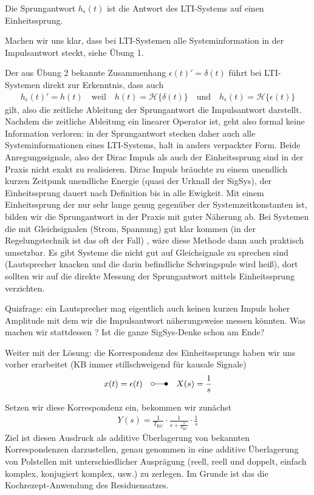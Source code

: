 \documentclass[11pt,a4paper,DIV=12]{scrartcl}
\numberwithin{equation}{section}
\numberwithin{figure}{section}
\begin{document}
\begin{Loesung}
\begin{itemize}
Die Sprungantwort $h_\epsilon(t)$ ist die Antwort des LTI-Systems auf einen Einheitssprung.

Machen wir uns klar, dass bei LTI-Systemen alle Systeminformation in der Impulsantwort
steckt, siehe Übung 1.

Der aus Übung 2 bekannte Zusammenhang $\epsilon(t)' = \delta(t)$ führt bei LTI-Systemen
direkt zur Erkenntnis, dass auch
\begin{eqnarray}
h_\epsilon(t)' = h(t)\quad\text{weil}\quad
h(t)=\mathcal{H}\{\delta(t)\}
\quad\text{und}\quad
h_\epsilon(t)=\mathcal{H}\{\epsilon(t)\}
\end{eqnarray}
gilt, also die zeitliche Ableitung der Sprungantwort die Impulsantwort darstellt.
%
Nachdem die zeitliche Ableitung ein linearer Operator ist, geht also formal keine
Information verloren: in der Sprungantwort stecken daher auch alle Systeminformationen
eines LTI-Systems, halt in anders verpackter Form.
%
Beide Anregungssignale, also der Dirac Impuls als auch der Einheitssprung sind in
der Praxis nicht exakt zu realisieren. Dirac Impuls bräuchte zu einem unendlich kurzen
Zeitpunk unendliche Energie (quasi der Urknall der SigSys), der Einheitssprung
dauert nach Definition bis in alle Ewigkeit.
%
Mit einem Einheitssprung der nur sehr lange genug gegenüber der Systemzeitkonstanten
ist, bilden wir die Sprungantwort in der Praxis mit guter Näherung ab.
%
Bei Systemen die mit Gleichsignalen
(Strom, Spannung) gut klar kommen
(in der Regelungstechnik ist das oft der Fall)
, wäre diese Methode dann auch praktisch umsetzbar.
%
Es gibt Systeme die nicht gut auf Gleichsignale zu sprechen sind (Lautsprecher
knacken und die darin befindliche Schwingspule wird heiß),
dort sollten wir auf die direkte Messung der Sprungantwort mittels
Einheitssprung verzichten.
%

Quizfrage: ein Lautsprecher mag eigentlich auch keinen kurzen Impuls hoher Amplitude
mit dem wir die Impulsantwort näherungsweise messen könnten. Was machen wir stattdessen
? Ist die ganze SigSys-Denke schon am Ende?


Weiter mit der Lösung: die Korrespondenz des Einheitssprungs
haben wir uns vorher erarbeitet (KB immer stillschweigend für kausale Signale)
\begin{equation}
x(t)=\epsilon(t) \quad \laplace \quad X(s)=\frac{1}{s}
\end{equation}

Setzen wir diese Korrespondenz ein, bekommen wir zunächst
\begin{align}
Y(s) = \frac{1}{T_\mathrm{RC}}\cdot\frac{1}{s + \frac{1}{T_\mathrm{RC}}} \cdot \frac{1}{s}
\end{align}
Ziel ist diesen Ausdruck als additive Überlagerung von bekannten Korrespondenzen
darzustellen, genau genommen in eine additive Überlagerung von Polstellen mit
unterschiedlicher Ausprägung
(reell, reell und doppelt, einfach komplex, konjugiert komplex, usw.) zu zerlegen.
Im Grunde ist das die Kochrezept-Anwendung des Residuensatzes.


\end{itemize}
\end{Loesung}
\end{document}
